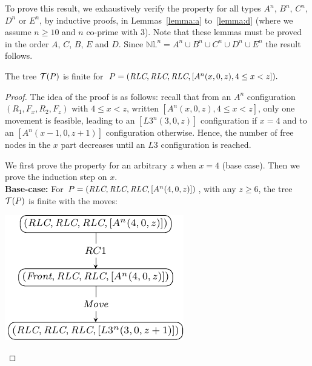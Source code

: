 To prove this result, we exhaustively verify the property for all
types $A^n$, $B^n$, $C^n$, $D^n$ or $E^n$, by inductive proofs, in
Lemmas~\ref{lemma:a} to~\ref{lemma:d} (where we assume $n \geq10$ and
$n$ co-prime with $3$). Note that  these lemmas must be proved in 
the order $A$, $C$, $B$, $E$ and $D$.
 Since $\mathbb{NL}^n = A^n \cup B^n \cup C^n
\cup D^n \cup E^n$ the result follows.
 

\begin{lemma}
\label{lemma:a}
The tree $\mathcal{T}(P)$ is finite for 
$P=(\textit{RLC}, \textit{RLC}, \textit{RLC}, 
[A^n(x, 0, z), 4 \leq x<z]).$
\end{lemma}
 
\begin{proof}
  The idea of the proof is as follows: recall that from an $A^n$
  configuration $(R_1, F_x, R_2, F_z)$ with $4 \leq x < z$, written
  $[A^n(x, 0, z), 4 \leq x<z]$, only one movement is feasible, leading to an
  $[L3^n(3, 0, z)]$ configuration if $x=4$ and to an $[A^n(x-1, 0, z+1)]$
  configuration otherwise.  Hence,  the number of free nodes in the $x$
  part decreases until an $L3$ configuration is reached.

  We first prove the property for an arbitrary $z$ when $x=4$ (base
  case). Then we prove the induction step on $x$.\\

\noindent \textbf{Base-case:} 
For $P=(\textit{RLC}, \textit{RLC}, \textit{RLC}, [A^n(4, 0, z)])$, with any $z \geq 6$,  the tree $\mathcal{T}(P)$ is finite
 with the moves:
\begin{center}
\includegraphics[scale=1]{figures/figAx4} 
\end{center}


\end{proof}

